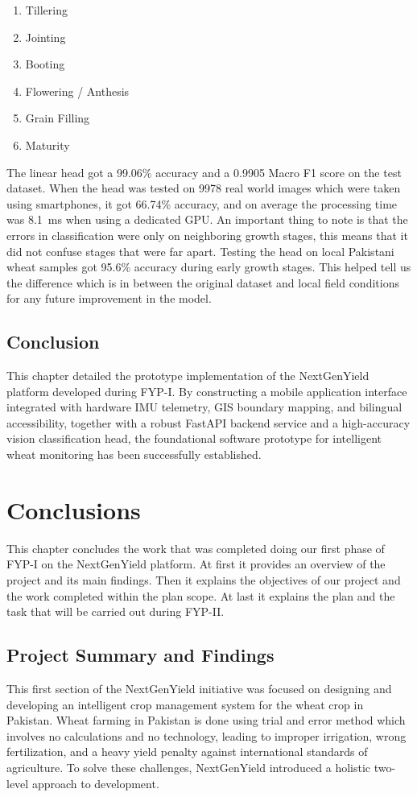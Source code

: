 \documentclass{FastFyp}
\begin{document}
\begin{enumerate}
    \item Tillering
    \item Jointing
    \item Booting
    \item Flowering / Anthesis
    \item Grain Filling
    \item Maturity
\end{enumerate}

The linear head got a 99.06\% accuracy and a 0.9905 Macro F1 score on the test dataset. When the head was tested on 9978 real world images which were taken using smartphones, it got 66.74\% accuracy, and on average the processing time was 8.1~ms when using a dedicated GPU. An important thing to note is that the errors in classification were only on neighboring growth stages, this means that it did not confuse stages that were far apart. Testing the head on local Pakistani wheat samples got 95.6\% accuracy during early growth stages. This helped tell us the difference which is in between the original dataset and local field conditions for any future improvement in the model.


\section{Conclusion}
This chapter detailed the prototype implementation of the NextGenYield platform developed during FYP-I. By constructing a mobile application interface integrated with hardware IMU telemetry, GIS boundary mapping, and bilingual accessibility, together with a robust FastAPI backend service and a high-accuracy vision classification head, the foundational software prototype for intelligent wheat monitoring has been successfully established.

\chapter{Conclusions}
This chapter concludes the work that was completed doing our first phase of FYP-I on the NextGenYield
platform. At first it provides an overview of the project and its main findings. Then it explains the objectives of our project and the work completed within the plan scope. At last it explains the plan and the task that will be carried out during FYP-II.
\section{Project Summary and Findings}
This first section of the NextGenYield initiative  was focused on designing and developing an intelligent crop management system for the wheat crop in Pakistan. Wheat farming in Pakistan is done using  trial and error method which involves no calculations and no technology, leading to improper irrigation, wrong fertilization, and a heavy yield penalty against international standards of agriculture. To solve  these challenges, NextGenYield introduced a holistic two-level approach to development.
\end{document}

